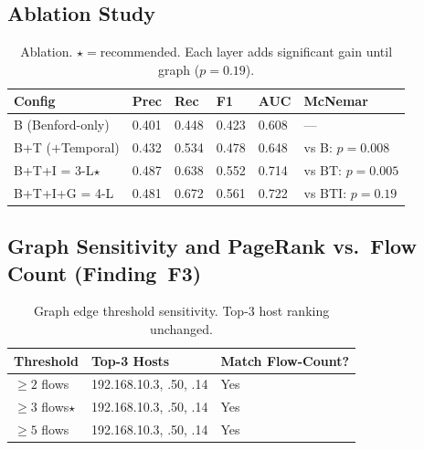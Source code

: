 \documentclass[journal,10pt,twoside]{IEEEtran}
\begin{document}
\subsection{Ablation Study}

\begin{table}[t]
\caption{Ablation. $\star{=}$recommended.  Each layer adds
  significant gain until graph ($p{=}0.19$).}
\label{tab:ablation}
\centering\small
\begin{tabular}{@{}L{2.45cm}P{0.75cm}P{0.65cm}P{0.6cm}P{0.75cm}
                   L{1.95cm}@{}}
\toprule
\textbf{Config} & Prec & Rec & F1 & AUC & McNemar \\
\midrule
B (Benford-only)   & 0.401 & 0.448 & 0.423 & 0.608 & --- \\
B+T ($+$Temporal)  & 0.432 & 0.534 & 0.478 & 0.648
  & vs B: $p{=}0.008$ \\
B+T+I = 3-L$\star$ & 0.487 & 0.638 & 0.552 & 0.714
  & vs BT: $p{=}0.005$ \\
B+T+I+G = 4-L      & 0.481 & 0.672 & 0.561 & 0.722
  & vs BTI: $p{=}0.19$ \\
\bottomrule
\end{tabular}
\end{table}

\subsection{Graph Sensitivity and PageRank vs.\ Flow Count
  (Finding~F3)}

\begin{table}[t]
\caption{Graph edge threshold sensitivity.
  Top-3 host ranking unchanged.}
\label{tab:edge_thresh}
\centering\small
\begin{tabular}{@{}L{1.55cm}L{3.45cm}P{1.9cm}@{}}
\toprule
\textbf{Threshold} & \textbf{Top-3 Hosts}
  & \textbf{Match Flow-Count?} \\
\midrule
$\ge2$ flows & 192.168.10.3, .50, .14 & Yes \\
$\ge3$ flows$\star$ & 192.168.10.3, .50, .14 & Yes \\
$\ge5$ flows & 192.168.10.3, .50, .14 & Yes \\
\bottomrule
\end{tabular}
\end{table}
\end{document}
